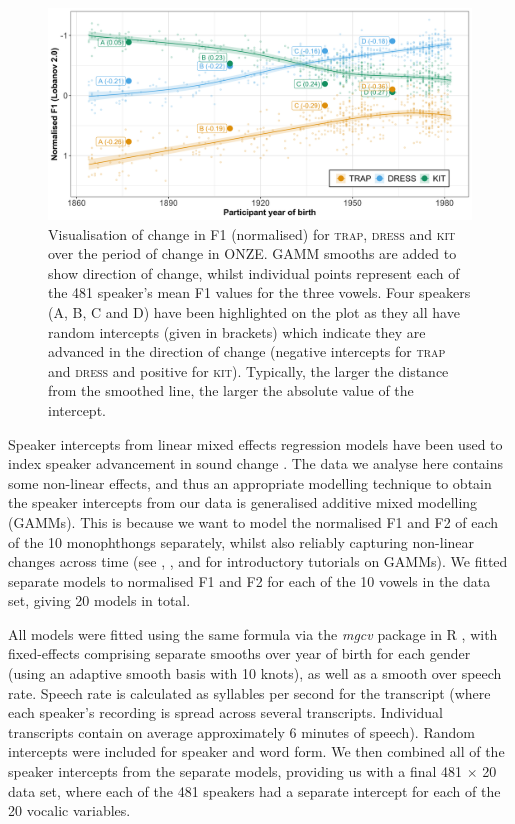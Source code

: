 \documentclass[review]{elsarticle} %
\begin{document}
\begin{figure}[!t]
\includegraphics[width=\textwidth]{Figures/F1_speaker_intercepts.png}
\caption{Visualisation of change in F1 (normalised) for \textsc{trap, dress} and \textsc{kit} over the period of change in ONZE. GAMM smooths are added to show direction of change, whilst individual points represent each of the 481 speaker's mean F1 values for the three vowels. Four speakers (A, B, C and D) have been highlighted on the plot as they all have random intercepts (given in brackets) which indicate they are advanced in the direction of change (negative intercepts for \textsc{trap} and \textsc{dress} and positive for \textsc{kit}). Typically, the larger the distance from the smoothed line, the larger the absolute value of the intercept.}
\label{fig:F1_speaker_intercepts}
\end{figure}


Speaker intercepts from linear mixed effects regression models have been used to index speaker advancement in sound change \cite{drager2012exploiting, soskuthy2017closing}.   The data we analyse here contains some non-linear effects, and thus an appropriate modelling technique to obtain the speaker intercepts from our data is generalised additive mixed modelling (GAMMs).  This is because we want to model the normalised F1 and F2 of each of the 10 monophthongs separately, whilst also reliably capturing non-linear changes across time (see \citealt{winter2016analyze}, \citealt{soskuthy2017generalised}, \citealt{wieling17tutorial} and \citealt{chuangetal20} for introductory tutorials on GAMMs). We fitted separate models to normalised F1 and F2 for each of the 10 vowels in the data set, giving 20 models in total. 

All models were fitted using the same formula via the \textit{mgcv} package in R \citep{wood2017generalized}, with fixed-effects comprising separate smooths over year of birth for each gender (using an adaptive smooth basis with 10 knots), as well as a smooth over speech rate.  Speech rate is calculated as syllables per second for the transcript (where each speaker's recording is spread across several transcripts. Individual transcripts contain on average approximately 6 minutes of speech).  Random intercepts were included for speaker and word form. We then combined all of the speaker intercepts from the separate models, providing us with a final 481 $\times$ 20 data set, where each of the 481 speakers had a separate intercept for each of the 20 vocalic variables.
\end{document}
